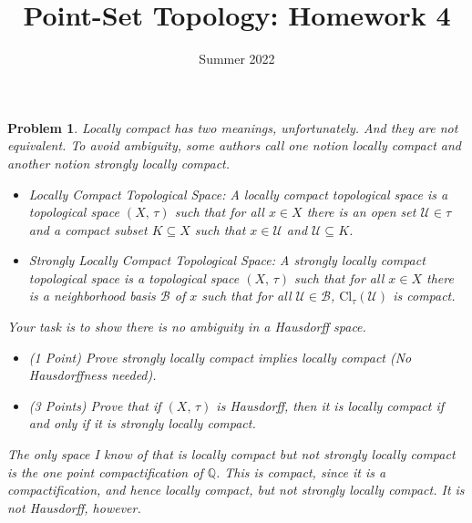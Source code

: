 \documentclass{article}
\title{Point-Set Topology: Homework 4}
\date{Summer 2022}
\theoremstyle{normal}
\newtheorem{problem}{Problem}
\begin{document}
    \maketitle
    \begin{problem}
        Locally compact has two meanings, unfortunately. And they are not
        equivalent. To avoid ambiguity, some authors call one notion
        \textit{locally compact} and another notion
        \textit{strongly locally compact}.
        \begin{itemize}
            \item Locally Compact Topological Space: A locally compact
                topological space is a topological space $(X,\,\tau)$ such that
                for all $x\in{X}$ there is an open set $\mathcal{U}\in\tau$
                and a compact subset $K\subseteq{X}$ such that
                $x\in\mathcal{U}$ and $\mathcal{U}\subseteq{K}$.
            \item Strongly Locally Compact Topological Space: A strongly
                locally compact topological space is a topological space
                $(X,\,\tau)$ such that for all $x\in{X}$ there is a
                neighborhood basis $\mathcal{B}$ of $x$ such that for all
                $\mathcal{U}\in\mathcal{B}$, $\textrm{Cl}_{\tau}(\mathcal{U})$
                is compact.
        \end{itemize}
        Your task is to show there is no ambiguity in a Hausdorff space.
        \begin{itemize}
            \item (1 Point) Prove strongly locally compact implies
                locally compact (No Hausdorffness needed).
            \item (3 Points) Prove that if $(X,\,\tau)$ is Hausdorff, then it
                is locally compact if and only if it is strongly locally
                compact.
        \end{itemize}
        The only space I know of that is locally compact but not strongly
        locally compact is the one point compactification of $\mathbb{Q}$.
        This is compact, since it is a compactification, and hence locally
        compact, but not strongly locally compact. It is not Hausdorff, however.
    \end{problem}
\end{document}
